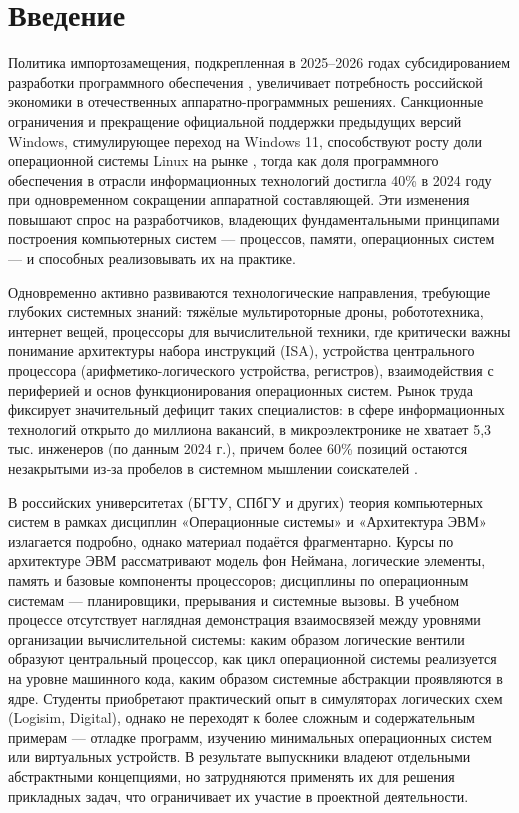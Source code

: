
\section*{Введение}
\thispagestyle{withCompileDate}

Политика импортозамещения, подкрепленная в 2025–2026 годах субсидированием разработки программного обеспечения \cite{itGrant}, увеличивает потребность российской экономики в отечественных аппаратно-программных решениях. Санкционные ограничения и прекращение официальной поддержки предыдущих версий Windows, стимулирующее переход на Windows 11, способствуют росту доли операционной системы Linux на рынке \cite{osIncrese}, тогда как доля программного обеспечения в отрасли информационных технологий достигла 40\% в 2024 году при одновременном сокращении аппаратной составляющей. Эти изменения повышают спрос на разработчиков, владеющих фундаментальными принципами построения компьютерных систем — процессов, памяти, операционных систем — и способных реализовывать их на практике.

Одновременно активно развиваются технологические направления, требующие глубоких системных знаний: тяжёлые мультироторные дроны, робототехника, интернет вещей, процессоры для вычислительной техники, где критически важны понимание архитектуры набора инструкций (ISA), устройства центрального процессора (арифметико-логического устройства, регистров), взаимодействия с периферией и основ функционирования операционных систем. Рынок труда фиксирует значительный дефицит таких специалистов: в сфере информационных технологий открыто до миллиона вакансий, в микроэлектронике не хватает 5,3 тыс. инженеров (по данным 2024 г.), причем более 60\% позиций остаются незакрытыми из‑за пробелов в системном мышлении соискателей \cite{elStatistic}.

В российских университетах (БГТУ, СПбГУ и других) теория компьютерных систем в рамках дисциплин «Операционные системы» и «Архитектура ЭВМ» излагается подробно, однако материал подаётся фрагментарно. Курсы по архитектуре ЭВМ рассматривают модель фон Неймана, логические элементы, память и базовые компоненты процессоров; дисциплины по операционным системам — планировщики, прерывания и системные вызовы. В учебном процессе отсутствует наглядная демонстрация взаимосвязей между уровнями организации вычислительной системы: каким образом логические вентили образуют центральный процессор, как цикл операционной системы реализуется на уровне машинного кода, каким образом системные абстракции проявляются в ядре. Студенты приобретают практический опыт в симуляторах логических схем (Logisim, Digital), однако не переходят к более сложным и содержательным примерам — отладке программ, изучению минимальных операционных систем или виртуальных устройств. В результате выпускники владеют отдельными абстрактными концепциями, но затрудняются применять их для решения прикладных задач, что ограничивает их участие в проектной деятельности.

